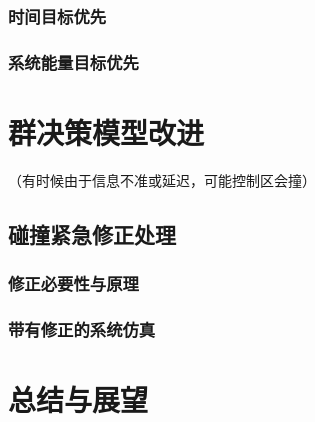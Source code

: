 \subsection{时间目标优先}
\subsection{系统能量目标优先}

\chapter{群决策模型改进}
（有时候由于信息不准或延迟，可能控制区会撞）
\section{碰撞紧急修正处理}
\subsection{修正必要性与原理}
\subsection{带有修正的系统仿真}
\section{}

\chapter{总结与展望}